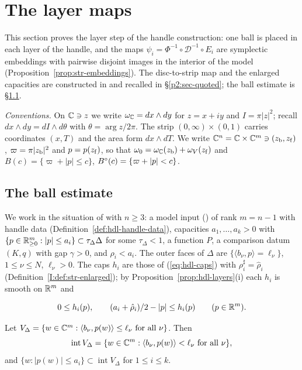 \section{The layer maps}\label{p2:sec-str}

This section proves the layer step of the handle construction: one ball is placed in each layer of the handle, and the
maps $\psi_i=\Phi^{-1}\circ\mathcal D^{-1}\circ E_i$ are symplectic embeddings with pairwise disjoint images in the interior
of the model (Proposition~\ref{prop:str-embeddings}). The disc-to-strip map and the enlarged capacities are constructed
in  and recalled in \S\ref{p2:sec-quoted}; the ball estimate is \S\ref{sec:str-balls}.

\medskip\noindent\emph{Conventions.} On $\mathbb{C}\ni z$ we write $\omega_{\mathbb{C}}=dx\wedge dy$ for $z=x+iy$ and $I=\pi|z|^2$;
recall $dx\wedge dy=dI\wedge d\theta$ with $\theta=\arg z/2\pi$. The strip $(0,\infty)\times(0,1)$ carries coordinates
$(x,T)$ and the area form $dx\wedge dT$. We write $\mathbb{C}^n=\mathbb{C}\times\mathbb{C}^m\ni(z_{\rm b},z_{\rm f})$,
$\varpi=\pi|z_{\rm b}|^2$ and $p=p(z_{\rm f})$, so that $\omega_0=\omega_{\mathbb{C}}(z_{\rm b})+\omega_V(z_{\rm f})$ and
$B(c)=\{\varpi+|p|\le c\}$, $B^{\circ}(c)=\{\varpi+|p|<c\}$.

\subsection{The ball estimate}\label{sec:str-balls}

We work in the situation of  with $n\ge3$: a model input () of rank $m=n-1$ with handle data (Definition~\ref{def:hdl-handle-data}), capacities $a_1,\dots,a_k>0$ with $\{p\in\mathbb{R}^m_{\ge0}:|p|\le a_i\}\subset\tau_\Delta\Delta$ for some $\tau_\Delta<1$, a function $P$, a comparison datum $(K,q)$ with gap $\gamma>0$, and $\rho_i<a_i$. The outer faces of $\Delta$ are $\{\langle b_\nu,p\rangle=\ell_\nu\}$, $1\le\nu\le N$, $\ell_\nu>0$. The caps $h_i$ are those of (\ref{eq:hdl-caps}) with $\rho_i^\sharp=\hat\rho_i$ (Definition~\ref{I:def:str-enlarged}); by Proposition~\ref{prop:hdl-layers}(i) each $h_i$ is smooth on $\mathbb{R}^m$ and

\begin{equation}\label{eq:str-cap}
 0\le h_i(p),\qquad (a_i+\hat\rho_i)/2-|p|\le h_i(p)\qquad(p\in\mathbb{R}^m).
\end{equation}

\begin{lemma}\label{lem:str-int}
Let $V_\Delta=\{w\in\mathbb{C}^m:\langle b_\nu,p(w)\rangle\le\ell_\nu\ \text{for all }\nu\}$. Then
\begin{equation}\label{eq:str-int}
 \operatorname{int}V_\Delta=\{w\in\mathbb{C}^m:\langle b_\nu,p(w)\rangle<\ell_\nu\ \text{for all }\nu\},
\end{equation}
and $\{w:|p(w)|\le a_i\}\subset\operatorname{int}V_\Delta$ for $1\le i\le k$.
\end{lemma}

